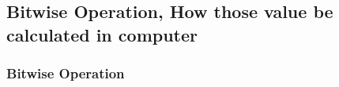 \documentclass[
  11pt, %
  xcolor=dvipsnames
]{beamer}
\begin{document}
\subsection{Bitwise Operation, How those value be calculated in computer}
\begin{frame}[fragile]
	\frametitle{Bitwise Operation}


	\begin{columns}[c]
		\begin{column}{0.9\textwidth}



\end{column}
\end{columns}
\end{frame}
\end{document}
